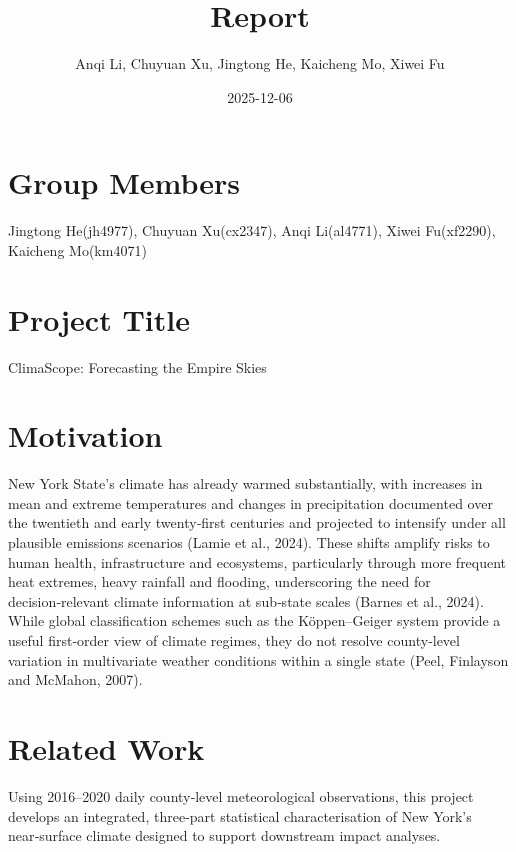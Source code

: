 \documentclass[
]{article}
\title{Report}
\author{Anqi Li, Chuyuan Xu, Jingtong He, Kaicheng Mo, Xiwei Fu}
\date{2025-12-06}
\begin{document}
\maketitle

{
\setcounter{tocdepth}{2}
\tableofcontents
}
\section{\texorpdfstring{\textbf{Group
Members}}{Group Members}}\label{group-members}

Jingtong He(jh4977), Chuyuan Xu(cx2347), Anqi Li(al4771), Xiwei
Fu(xf2290), Kaicheng Mo(km4071)

\section{\texorpdfstring{\textbf{Project
Title}}{Project Title}}\label{project-title}

ClimaScope: Forecasting the Empire Skies

\section{\texorpdfstring{\textbf{Motivation}}{Motivation}}\label{motivation}

New York State's climate has already warmed substantially, with
increases in mean and extreme temperatures and changes in precipitation
documented over the twentieth and early twenty‑first centuries and
projected to intensify under all plausible emissions scenarios (Lamie et
al., 2024). These shifts amplify risks to human health, infrastructure
and ecosystems, particularly through more frequent heat extremes, heavy
rainfall and flooding, underscoring the need for decision‑relevant
climate information at sub‑state scales (Barnes et al., 2024). While
global classification schemes such as the Köppen--Geiger system provide
a useful first‑order view of climate regimes, they do not resolve
county‑level variation in multivariate weather conditions within a
single state (Peel, Finlayson and McMahon, 2007).

\section{\texorpdfstring{\textbf{Related
Work}}{Related Work}}\label{related-work}

Using 2016--2020 daily county‑level meteorological observations, this
project develops an integrated, three‑part statistical characterisation
of New York's near‑surface climate designed to support downstream impact
analyses.
\end{document}
